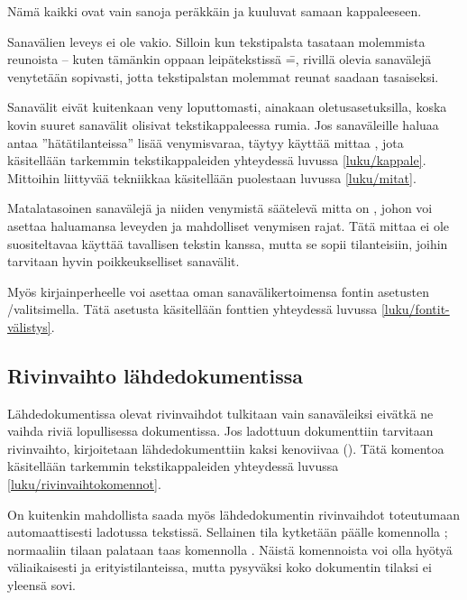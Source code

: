 \begin{tulossis}
  Nämä kaikki ovat vain sanoja peräkkäin ja kuuluvat samaan
  kappaleeseen.
\end{tulossis}

\noindent
Sanavälien leveys ei ole vakio. Silloin kun tekstipalsta tasataan
molemmista reunoista -- kuten tämänkin oppaan leipätekstissä \==,
rivillä olevia sanavälejä venytetään sopivasti, jotta tekstipalstan
molemmat reunat saadaan tasaiseksi.

Sanavälit eivät kuitenkaan veny loputtomasti, ainakaan
oletusasetuksilla, koska kovin suuret sanavälit olisivat
tekstikappaleessa rumia. Jos sanaväleille haluaa antaa
''hätätilanteissa'' lisää venymisvaraa, täytyy käyttää mittaa
, jota käsitellään tarkemmin tekstikappaleiden
yhteydessä luvussa \ref{luku/kappale}. Mittoihin liittyvää tekniikkaa
käsitellään puolestaan luvussa \ref{luku/mitat}.

Matalatasoinen sanavälejä ja niiden venymistä säätelevä mitta on
, johon voi asettaa haluamansa leveyden ja mahdolliset
venymisen rajat. Tätä mittaa ei ole suositeltavaa käyttää tavallisen
tekstin kanssa, mutta se sopii tilanteisiin, joihin tarvitaan hyvin
poikkeukselliset sanavälit.

\begin{koodilohkosis}
\setlength{\spaceskip}{0.8em plus 0.3em minus 0.2em}
\end{koodilohkosis}

\noindent
Myös kirjainperheelle voi asettaa oman sanavälikertoimensa fontin
asetusten \-/valitsimella. Tätä asetusta käsitellään
fonttien yhteydessä luvussa \ref{luku/fontit-välistys}.

\subsection{Rivinvaihto lähdedokumentissa}
\label{luku/rivinvaihtomerkit}

Lähdedokumentissa olevat rivinvaihdot tulkitaan vain sanaväleiksi
eivätkä ne vaihda riviä lopullisessa dokumentissa. Jos ladottuun
dokumenttiin tarvitaan rivinvaihto, kirjoitetaan lähdedokumenttiin kaksi
kenoviivaa (\komentom{\keno}). Tätä komentoa käsitellään tarkemmin
tekstikappaleiden yhteydessä luvussa \ref{luku/rivinvaihtokomennot}.

On kuitenkin mahdollista saada myös lähdedokumentin rivinvaihdot
toteutumaan automaattisesti ladotussa tekstissä. Sellainen tila
kytketään päälle komennolla ; normaaliin tilaan
palataan taas komennolla . Näistä komennoista voi
olla hyötyä väliaikaisesti ja erityistilanteissa, mutta pysyväksi koko
dokumentin tilaksi  ei yleensä sovi.


